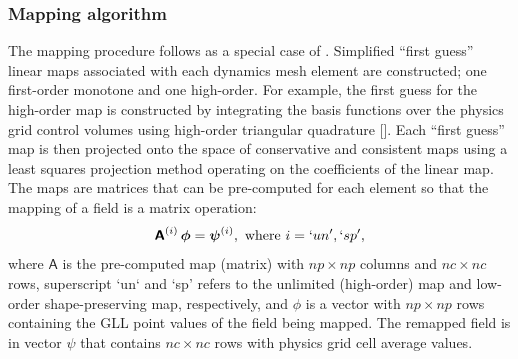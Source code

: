 \subsubsection{Mapping algorithm}  The mapping procedure follows as a special case of \citet{UT2015MWR}.  Simplified ``first guess'' linear maps associated with each dynamics mesh element are constructed; one first-order monotone and one high-order. For example, the first guess for the high-order map is constructed by integrating the basis functions over the physics grid control volumes using high-order triangular quadrature [{\color{red}{paul: what are we using here?}}]. Each ``first guess'' map is then projected onto the space of conservative and consistent maps using a least squares projection method operating on the coefficients of the linear map. The maps are matrices that can be pre-computed for each element so that the mapping of a field is a matrix operation:
\begin{equation}
\bm{\mathsf{A}}^{(i)}\, \bm{\mathsf{\phi}}=\bm{\mathsf{\psi}}^{(i)},\text{ where }i=`un',`sp', 
\end{equation}
where $\bm{\mathsf{A}}$ is the pre-computed map (matrix) with $np\times np$ columns and $nc\times nc$ rows, superscript `un` and `sp' refers to the unlimited (high-order) map and low-order shape-preserving map, respectively, and $\bm{\mathsf{\phi}}$ is a vector with $np\times np$ rows containing the GLL point values of the field being mapped. The remapped field is in vector $\bm{\mathsf{\psi}}$ that contains $nc\times nc$ rows with physics grid cell average values.

